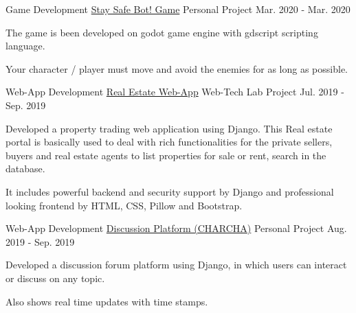 

\begin{cventries}

  \cventry
    {Game Development} %
    {\href{https://github.com/AbhiSaphire/Stay-Safe-Bot-Game}{Stay Safe Bot! Game}} %
    {Personal Project} %
    {Mar. 2020 - Mar. 2020} %
    {
      \begin{cvitems} %
        \item {The game is been developed on godot game engine with gdscript scripting language.}
        \item {Your character / player must move and avoid the enemies for as long as possible.}
      \end{cvitems}
    }

  \cventry
    {Web-App Development} %
    {\href{https://github.com/AbhiSaphire/Django-RealEstate-WebApp}{Real Estate Web-App}} %
    {Web-Tech Lab Project} %
    {Jul. 2019 - Sep. 2019} %
    {
      \begin{cvitems} %
        \item {Developed a property trading web application using Django. This Real estate portal is basically used to deal with rich functionalities for the private sellers, buyers and real estate agents to list properties for sale or rent, search in the database.}
        \item {It includes powerful backend and security support by Django and professional looking frontend by HTML, CSS, Pillow and Bootstrap.}
      \end{cvitems}
    }

  \cventry
    {Web-App Development} %
    {\href{https://github.com/AbhiSaphire/Django-DiscussionForum}{Discussion Platform (CHARCHA)}} %
    {Personal Project} %
    {Aug. 2019 - Sep. 2019} %
    {
      \begin{cvitems} %
        \item {Developed a discussion forum platform using Django, in which users can interact or discuss on any topic.}
        \item {Also shows real time updates with time stamps.}
      \end{cvitems}
    }


\end{cventries}
